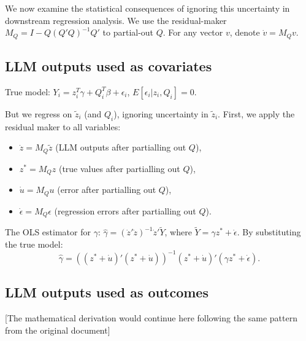 \documentclass[11pt]{article}
\begin{document}
We now examine the statistical consequences of ignoring this uncertainty in downstream regression analysis. We use the residual-maker $M_Q = I - Q(Q'Q)^{-1}Q'$ to partial-out $Q$. For any vector $v$, denote $\dot{v} = M_Q v$.

\subsection{LLM outputs used as covariates}

True model: $Y_i = z_i^T\gamma + Q_i^T\beta + \epsilon_i$, $E[\epsilon_i|z_i, Q_i] = 0$.

But we regress on $\tilde{z}_i$ (and $Q_i$), ignoring uncertainty in $\tilde{z}_i$. First, we apply the residual maker to all variables:
\begin{itemize}
\item $\dot{z} = M_Q\tilde{z}$ (LLM outputs after partialling out $Q$),
\item $z^* = M_Q z$ (true values after partialling out $Q$),
\item $\dot{u} = M_Q u$ (error after partialling out $Q$),
\item $\dot{\epsilon} = M_Q \epsilon$ (regression errors after partialling out $Q$).
\end{itemize}

The OLS estimator for $\gamma$: $\hat{\gamma} = (\dot{z}'\dot{z})^{-1}\dot{z}'\tilde{Y}$, where $\tilde{Y} = \gamma z^* + \dot{\epsilon}$. By substituting the true model:
\begin{equation}
\hat{\gamma} = ((z^* + \dot{u})'(z^* + \dot{u}))^{-1}(z^* + \dot{u})'(\gamma z^* + \dot{\epsilon}).
\end{equation}

\subsection{LLM outputs used as outcomes}

[The mathematical derivation would continue here following the same pattern from the original document]
\end{document}
